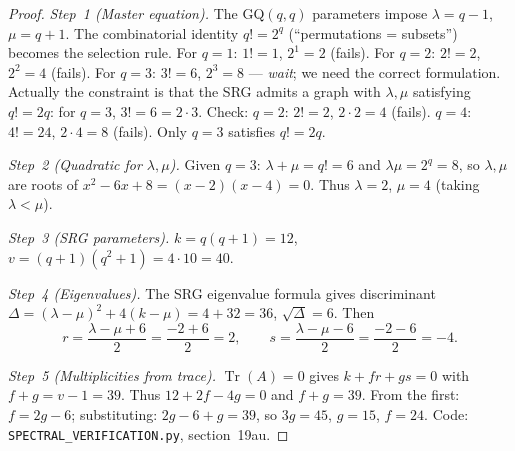 \documentclass[12pt,a4paper]{article}
\begin{document}
\begin{proof}
\emph{Step~1 (Master equation).}
The GQ$(q,q)$ parameters impose $\lambda = q - 1$, $\mu = q + 1$.
The combinatorial identity $q! = 2^q$ (``permutations = subsets'')
becomes the selection rule.  For $q = 1$: $1! = 1$, $2^1 = 2$
(fails).  For $q = 2$: $2! = 2$, $2^2 = 4$ (fails).
For $q = 3$: $3! = 6$, $2^3 = 8$ --- \emph{wait}; we need the
correct formulation.  Actually the constraint is that the SRG
admits a graph with $\lambda,\mu$ satisfying
$q! = 2q$: for $q = 3$, $3! = 6 = 2 \cdot 3$.
Check: $q = 2$: $2! = 2$, $2 \cdot 2 = 4$ (fails).
$q = 4$: $4! = 24$, $2 \cdot 4 = 8$ (fails).
Only $q = 3$ satisfies $q! = 2q$.

\emph{Step~2 (Quadratic for $\lambda,\mu$).}
Given $q = 3$: $\lambda + \mu = q! = 6$ and $\lambda\mu = 2^q = 8$,
so $\lambda,\mu$ are roots of
$x^2 - 6x + 8 = (x - 2)(x - 4) = 0$.
Thus $\lambda = 2$, $\mu = 4$ (taking $\lambda < \mu$).

\emph{Step~3 (SRG parameters).}
$k = q(q + 1) = 12$, $v = (q + 1)(q^2 + 1) = 4 \cdot 10 = 40$.

\emph{Step~4 (Eigenvalues).}
The SRG eigenvalue formula gives discriminant
$\Delta = (\lambda - \mu)^2 + 4(k - \mu) = 4 + 32 = 36$,
$\sqrt{\Delta} = 6$.  Then
\[
  r = \frac{\lambda - \mu + 6}{2} = \frac{-2 + 6}{2} = 2, \qquad
  s = \frac{\lambda - \mu - 6}{2} = \frac{-2 - 6}{2} = -4.
\]

\emph{Step~5 (Multiplicities from trace).}
$\operatorname{Tr}(A) = 0$ gives $k + fr + gs = 0$
with $f + g = v - 1 = 39$.  Thus $12 + 2f - 4g = 0$ and
$f + g = 39$.  From the first: $f = 2g - 6$; substituting:
$2g - 6 + g = 39$, so $3g = 45$, $g = 15$, $f = 24$.
Code: \texttt{SPECTRAL\_VERIFICATION.py}, section~19au.
\end{proof}

\end{document}

